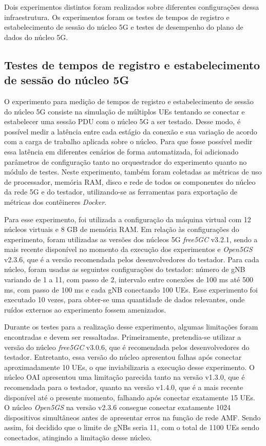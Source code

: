 Dois experimentos distintos foram realizados sobre diferentes configurações dessa infraestrutura.
Os experimentos foram os testes de tempos de registro e estabelecimento de sessão do núcleo 5G e testes de desempenho do plano de dados do núcleo 5G.

\subsection{Testes de tempos de registro e estabelecimento de sessão do núcleo 5G}

O experimento para medição de tempos de registro e estabelecimento de sessão do núcleo 5G consiste na simulação de múltiplos UEs tentando se conectar e estabelecer uma sessão PDU com o núcleo 5G a ser testado.
Desse modo, é possível medir a latência entre cada estágio da conexão e sua variação de acordo com a carga de trabalho aplicada sobre o núcleo.
Para que fosse possível medir essa latência em diferentes cenários de forma automatizada, foi adicionado parâmetros de configuração tanto no orquestrador do experimento quanto no módulo de testes.
Neste experimento, também foram coletadas as métricas de uso de processador, memória RAM, disco e rede de todos os componentes do núcleo da rede 5G e do testador, utilizando-se as ferramentas para exportação de métricas dos contêineres \textit{Docker}.

Para esse experimento, foi utilizada a configuração da máquina virtual com 12 núcleos virtuais e 8 GB de memória RAM.
Em relação às configurações do experimento, foram utilizadas as versões dos núcleos 5G \textit{free5GC} v3.2.1, sendo a mais recente disponível no momento da execução dos experimentos e \textit{Open5GS} v2.3.6, que é a versão recomendada pelos desenvolvedores do testador.
Para cada núcleo, foram usadas as seguintes configurações do testador: número de gNB variando de 1 a 11, com passo de 2, intervalo entre conexões de 100 ms até 500 ms, com passo de 100 ms e cada gNB conectando 100 UEs.
Esse experimento foi executado 10 vezes, para obter-se uma quantidade de dados relevantes, onde ruídos externos ao experimento fossem amenizados.

Durante os testes para a realização desse experimento, algumas limitações foram encontradas e devem ser ressaltadas.
Primeiramente, pretendia-se utilizar a versão do núcleo \textit{free5GC} v3.0.6, que é recomendada pelos desenvolvedores do testador. Entretanto, essa versão do núcleo apresentou falhas após conectar aproximadamente 10 UEs, o que inviabilizaria a execução desse experimento.
O núcleo OAI apresentou uma limitação parecida tanto na versão v1.3.0, que é recomendada para o testador, quanto na versão v1.4.0, que é a mais recente disponível até o presente momento, falhando após conectar exatamente 15 UEs.
O núcleo \textit{Open5GS} na versão v2.3.6 consegue conectar exatamente 1024 dispositivos simultâneos antes de apresentar erros na função de rede AMF. Sendo assim, foi decidido que o limite de gNBs seria 11, com o total de 1100 UEs sendo conectados, atingindo a limitação desse núcleo.


